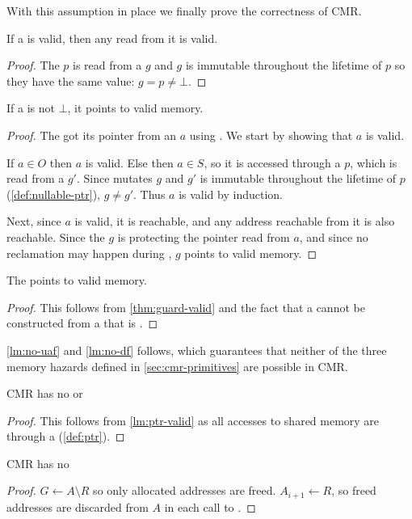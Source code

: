 With this assumption in place we finally prove the correctness of CMR\@.

\begin{lemma}
If a  is valid, then any  read from it is valid.
\end{lemma}
\begin{proof}
  The  $p$ is read from a  $g$ and $g$ is immutable throughout the lifetime of
  $p$ so they have the same value: $g = p \neq \bot$.
\end{proof}

\begin{theorem}\label{thm:guard-valid}
  If a  is not $\bot$, it points to valid memory.
\end{theorem}
\begin{proof}
  The  got its pointer from an  $a$ using .
  We start by showing that $a$ is valid.

  If $a \in O$ then $a$ is valid.  Else then $a \in S$, so
  it is accessed through a  $p$, which is read from a  $g'$.  Since
   mutates $g$ and $g'$ is immutable throughout the lifetime of $p$
  (\cref{def:nullable-ptr}), $g \neq g'$. Thus $a$ is valid by induction.

  Next, since $a$ is valid, it is reachable, and any address reachable from it is also reachable.
  Since the  $g$ is protecting the pointer read from $a$, and since no reclamation may
  happen during , $g$ points to valid memory.
\end{proof}

\begin{lemma}\label{lm:ptr-valid}
  The  points to valid memory.
\end{lemma}
\begin{proof}
  This follows from \cref{thm:guard-valid} and the fact that a  cannot be constructed from
  a  that is \nullptr.
\end{proof}

\cref{lm:no-uaf} and \cref{lm:no-df} follows, which guarantees that neither of the three memory
hazards defined in \cref{sec:cmr-primitives} are possible in CMR.

\begin{theorem}\label{lm:no-uaf}
  CMR has no  or 
\end{theorem}
\begin{proof}
  This follows from \cref{lm:ptr-valid} as all accesses to shared memory are through a 
  (\cref{def:ptr}).
\end{proof}

\begin{theorem}\label{lm:no-df}
  CMR has no 
\end{theorem}
\begin{proof}
  $G \gets A \setminus R$ so only allocated addresses are freed. $A_{i+1} \gets R$, so freed
  addresses are discarded from $A$ in each call to .
\end{proof}
